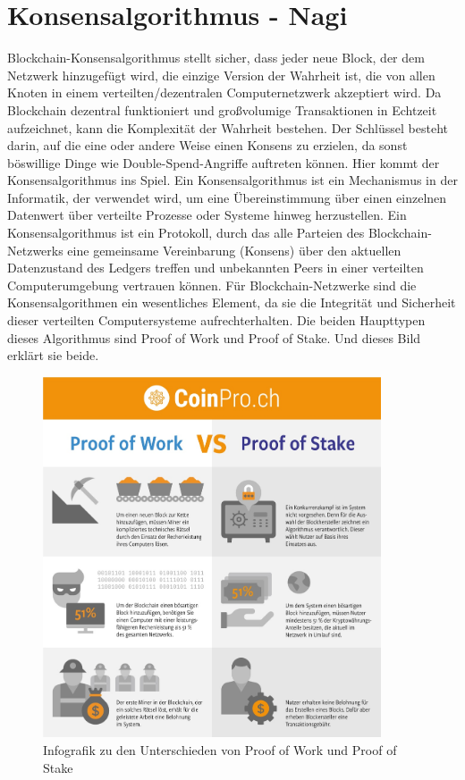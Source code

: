 \section{Konsensalgorithmus - Nagi}
Blockchain-Konsensalgorithmus stellt sicher, dass jeder neue Block, der dem Netzwerk hinzugefügt wird, die einzige Version der Wahrheit ist, die von allen Knoten in einem verteilten/dezentralen Computernetzwerk akzeptiert wird.
Da Blockchain dezentral funktioniert und großvolumige Transaktionen in Echtzeit aufzeichnet, kann die Komplexität der Wahrheit bestehen. Der Schlüssel besteht darin, auf die eine oder andere Weise einen Konsens zu erzielen, da sonst böswillige Dinge wie Double-Spend-Angriffe auftreten können. Hier kommt der Konsensalgorithmus ins Spiel.
Ein Konsensalgorithmus ist ein Mechanismus in der Informatik, der verwendet wird, um eine Übereinstimmung über einen einzelnen Datenwert über verteilte Prozesse oder Systeme hinweg herzustellen. Ein Konsensalgorithmus ist ein Protokoll, durch das alle Parteien des Blockchain-Netzwerks eine gemeinsame Vereinbarung (Konsens) über den aktuellen Datenzustand des Ledgers treffen und unbekannten Peers in einer verteilten Computerumgebung vertrauen können.
Für Blockchain-Netzwerke sind die Konsensalgorithmen ein wesentliches Element, da sie die Integrität und Sicherheit dieser verteilten Computersysteme aufrechterhalten. Die beiden Haupttypen dieses Algorithmus sind Proof of Work und Proof of Stake. Und dieses Bild erklärt sie beide.
\begin{figure}[ht!]
	\centering
	\includegraphics[width=100mm]{ProofOfWorkVSProfOfStake.jpg}
	\caption{Infografik zu den Unterschieden von Proof of Work und Proof of Stake} \label{overflow}
\end{figure}


